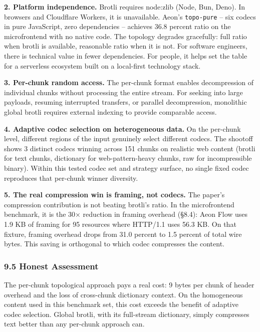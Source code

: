 \documentclass[
]{article}
\begin{document}
\textbf{2. Platform independence.} Brotli requires node:zlib (Node, Bun,
Deno). In browsers and Cloudflare Workers, it is unavailable. Aeon's
\texttt{topo-pure} -- six codecs in pure JavaScript, zero dependencies
-- achieves 36.8 percent ratio on the microfrontend with no native code.
The topology degrades gracefully: full ratio when brotli is available,
reasonable ratio when it is not. For software engineers, there is
technical value in fewer dependencies. For people, it helps set the
table for a serverless ecosystem built on a local-first technology
stack.

\textbf{3. Per-chunk random access.} The per-chunk format enables
decompression of individual chunks without processing the entire stream.
For seeking into large payloads, resuming interrupted transfers, or
parallel decompression, monolithic global brotli requires external
indexing to provide comparable access.

\textbf{4. Adaptive codec selection on heterogeneous data.} On the
per-chunk level, different regions of the input genuinely select
different codecs. The shootoff shows 3 distinct codecs winning across
151 chunks on realistic web content (brotli for text chunks, dictionary
for web-pattern-heavy chunks, raw for incompressible binary). Within
this tested codec set and strategy surface, no single fixed codec
reproduces that per-chunk winner diversity.

\textbf{5. The real compression win is framing, not codecs.} The paper's
compression contribution is not beating brotli's ratio. In the
microfrontend benchmark, it is the 30× reduction in framing overhead
(§8.4): Aeon Flow uses 1.9 KB of framing for 95 resources where HTTP/1.1
uses 56.3 KB. On that fixture, framing overhead drops from 31.0 percent
to 1.5 percent of total wire bytes. This saving is orthogonal to which
codec compresses the content.

\subsubsection{\texorpdfstring{\textbf{9.5 Honest
Assessment}}{9.5 Honest Assessment}}\label{honest-assessment}

The per-chunk topological approach pays a real cost: 9 bytes per chunk
of header overhead and the loss of cross-chunk dictionary context. On
the homogeneous content used in this benchmark set, this cost exceeds
the benefit of adaptive codec selection. Global brotli, with its
full-stream dictionary, simply compresses text better than any per-chunk
approach can.
\end{document}
